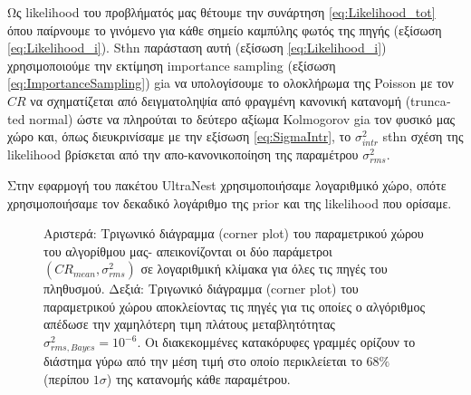 Ως \textlatin{likelihood} του προβλήματός μας θέτουμε την συνάρτηση \ref{eq:Likelihood_tot} όπου παίρνουμε το γινόμενο για κάθε σημείο καμπύλης φωτός της πηγής (εξίσωση \ref{eq:Likelihood_i}). Sthn παράσταση αυτή (εξίσωση \ref{eq:Likelihood_i}) χρησιμοποιούμε την εκτίμηση \textlatin{importance sampling} (εξίσωση \ref{eq:ImportanceSampling}) gia να υπολογίσουμε το ολοκλήρωμα της \textlatin{Poisson} με τον $CR$ να σχηματίζεται από δειγματοληψία από φραγμένη κανονική κατανομή (\textlatin{truncated normal}) ώστε να πληρούται το δεύτερο αξίωμα \textlatin{Kolmogorov} gia  τον φυσικό μας χώρο και, όπως διευκρινίσαμε με την εξίσωση \ref{eq:SigmaIntr}, το $\sigma_{intr}^2$ sthn σχέση της \textlatin{likelihood} βρίσκεται από την απο-κανονικοποίηση της παραμέτρου $\sigma_{rms}^2$.

Στην εφαρμογή του πακέτου \textlatin{UltraNest} χρησιμοποιήσαμε λογαριθμικό χώρο, οπότε χρησιμοποιήσαμε τον δεκαδικό λογάριθμο της \textlatin{prior} και της \textlatin{likelihood} που ορίσαμε.

\begin{figure}%
    \centering
    \qquad
     \caption{Αριστερά: Τριγωνικό διάγραμμα \textlatin{(corner plot)} του παραμετρικού χώρου του αλγορίθμου μας- απεικονίζονται οι δύο παράμετροι $(CR_{mean}, \sigma_{rms}^2)$ σε λογαριθμική κλίμακα για όλες τις πηγές του πληθυσμού. Δεξιά: Τριγωνικό διάγραμμα \textlatin{(corner plot)} του παραμετρικού χώρου αποκλείοντας τις πηγές για τις οποίες ο αλγόριθμος απέδωσε την χαμηλότερη τιμη πλάτους μεταβλητότητας $\sigma_{rms, Bayes}^2 =10^{-6}$. Οι διακεκομμένες κατακόρυφες γραμμές ορίζουν το διάστημα γύρω από την μέση τιμή στο οποίο περικλείεται το $68\%$ (περίπου $1\sigma$) της κατανομής κάθε παραμέτρου.}  \label{fig:Corner}
\end{figure}
  
